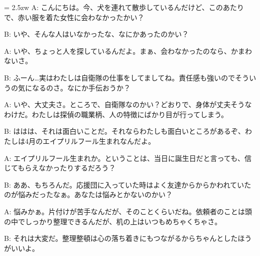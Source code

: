\documentclass[11pt]{amsart}
\title{}
\author{}
\newenvironment{hangall}[1]{\hangindent = 2.5zw\everypar{\hangindent = 2.5zw}}{}
\begin{document}
\maketitle
\begin{hangall}{}%
A: こんにちは。今、犬を連れて散歩しているんだけど、このあたりで、赤い服を着た女性に会わなかったかい？

B: いや、そんな人はいなかったな、なにかあったのかい？

A: いや、ちょっと人を探しているんだよ。まぁ、会わなかったのなら、かまわないさ。

B: ふーん…実はわたしは自衛隊の仕事をしてましてね。責任感も強いのでそういうの気になるのさ。なにか手伝おうか？

A: いや、大丈夫さ。ところで、自衛隊なのかい？どおりで、身体が丈夫そうなわけだ。わたしは探偵の職業柄、人の特徴にばかり目が行ってしまう。

B: ははは、それは面白いことだ。それならわたしも面白いところがあるぞ、わたしは4月のエイプリルフール生まれなんだよ。

A: エイプリルフール生まれか。ということは、当日に誕生日だと言っても、信じてもらえなかったりするだろう？

B: ああ、もちろんだ。応援団に入っていた時はよく友達からからかわれていたのが悩みだったなぁ。あなたは悩みとかないのかい？

A: 悩みかぁ。片付けが苦手なんだが、そのことくらいだね。依頼者のことは頭の中でしっかり整理できるんだが、机の上はいつもめちゃくちゃさ。

B: それは大変だ。整理整頓は心の落ち着きにもつながるからちゃんとしたほうがいいよ。
\end{hangall}
\end{document}
